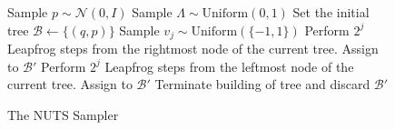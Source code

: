 \begin{figure}[H]
	\begin{algorithm}[H]
	\caption{The NUTS Sampler}\label{algo:nuts}
	\begin{algorithmic}
            \State Sample $p \sim \mathcal{N}(0, I)$
            \State Sample $\Lambda \sim \text{Uniform}(0, 1)$
            \State Set the initial tree $\mathcal{B} \gets \{(q, p)\}$
                \State Sample $v_j \sim \text{Uniform}(\{-1, 1\})$
                    \State Perform $2^j$ Leapfrog steps from the rightmost node of the current tree. Assign to $\mathcal{B}'$
                \Else
                    \State Perform $2^j$ Leapfrog steps from the leftmost node of the current tree. Assign to $\mathcal{B}'$
                \EndIf
                    \State Terminate building of tree and discard $\mathcal{B}'$
                \EndIf
            \EndFor
        \EndFunction
	\end{algorithmic}
	\end{algorithm}
\end{figure}

